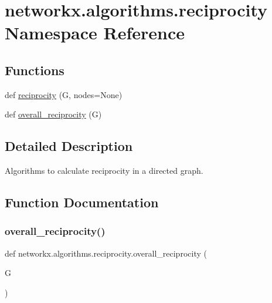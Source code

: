 \hypertarget{namespacenetworkx_1_1algorithms_1_1reciprocity}{}\section{networkx.\+algorithms.\+reciprocity Namespace Reference}
\label{namespacenetworkx_1_1algorithms_1_1reciprocity}
\subsection*{Functions}
\begin{DoxyCompactItemize}
\item 
def \hyperlink{namespacenetworkx_1_1algorithms_1_1reciprocity_ad9c5eb2c7c95917ff11d3a87624d7fee}{reciprocity} (G, nodes=None)
\item 
def \hyperlink{namespacenetworkx_1_1algorithms_1_1reciprocity_ae1baaf556d255bac051beca291b3d846}{overall\+\_\+reciprocity} (G)
\end{DoxyCompactItemize}


\subsection{Detailed Description}
\begin{DoxyVerb}Algorithms to calculate reciprocity in a directed graph.\end{DoxyVerb}
 

\subsection{Function Documentation}
\mbox{\label{namespacenetworkx_1_1algorithms_1_1reciprocity_ae1baaf556d255bac051beca291b3d846}} 
\subsubsection{\texorpdfstring{overall\+\_\+reciprocity()}{overall\_reciprocity()}}
{\footnotesize\ttfamily def networkx.\+algorithms.\+reciprocity.\+overall\+\_\+reciprocity (\begin{DoxyParamCaption}\item[{}]{G }\end{DoxyParamCaption})}

